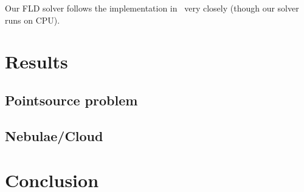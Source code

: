 Our FLD solver follows the implementation in~\cite{Koerner14} very closely (though our solver runs on CPU).

\section{Results}
\label{sec:results}

\subsection{Pointsource problem}
\subsection{Nebulae/Cloud}

\section{Conclusion}
\label{sec:conclusion}






%







